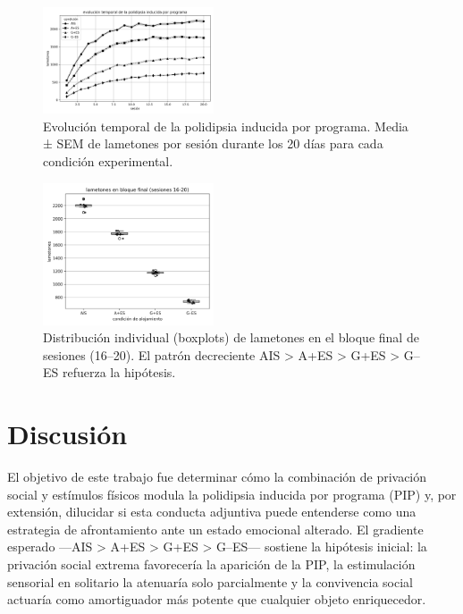 \documentclass[12pt,a4paper]{article}
\begin{document}
\begin{multicols}{2}
\begin{figure}[H]
\centering
\includegraphics[width=0.45\textwidth]{figura1.png}
\caption{Evolución temporal de la polidipsia inducida por programa. Media ± SEM de lametones por sesión durante los 20 días para cada condición experimental.}
\label{fig:figura1}
\end{figure}

\begin{figure}[H]
\centering
\includegraphics[width=0.45\textwidth]{figura2.png}
\caption{Distribución individual (boxplots) de lametones en el bloque final de sesiones (16–20). El patrón decreciente AIS > A+ES > G+ES > G--ES refuerza la hipótesis.}
\label{fig:figura2}
\end{figure}


\section{Discusión}

El objetivo de este trabajo fue determinar cómo la combinación de privación social y estímulos físicos modula la polidipsia inducida por programa (PIP) y, por extensión, dilucidar si esta conducta adjuntiva puede entenderse como una estrategia de afrontamiento ante un estado emocional alterado. El gradiente esperado —AIS > A+ES > G+ES > G--ES— sostiene la hipótesis inicial: la privación social extrema favorecería la aparición de la PIP, la estimulación sensorial en solitario la atenuaría solo parcialmente y la convivencia social actuaría como amortiguador más potente que cualquier objeto enriquecedor.


\end{multicols}
\end{document}
